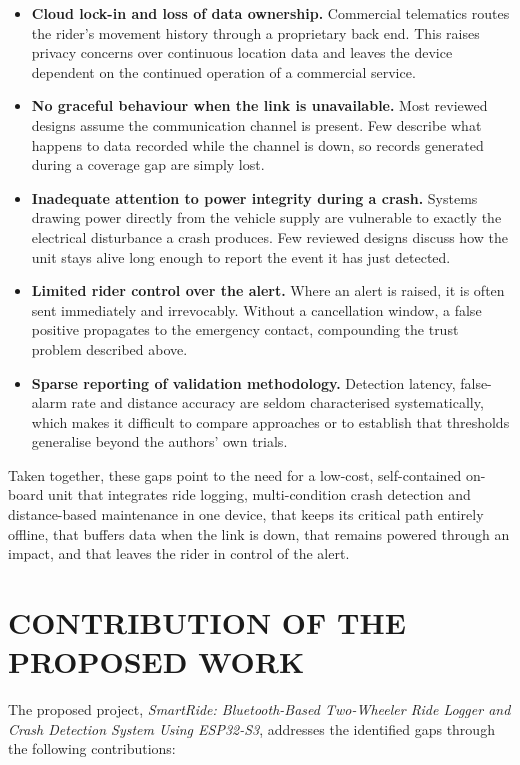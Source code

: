 \documentclass[12pt,a4paper,oneside]{report}
\begin{document}
\begin{itemize}[leftmargin=*,itemsep=0.6em,topsep=0.7em]
\item \textbf{Cloud lock-in and loss of data ownership.} Commercial telematics routes the
rider's movement history through a proprietary back end. This raises privacy concerns over
continuous location data and leaves the device dependent on the continued operation of a
commercial service.

\item \textbf{No graceful behaviour when the link is unavailable.} Most reviewed designs
assume the communication channel is present. Few describe what happens to data recorded
while the channel is down, so records generated during a coverage gap are simply lost.

\item \textbf{Inadequate attention to power integrity during a crash.} Systems drawing power
directly from the vehicle supply are vulnerable to exactly the electrical disturbance a
crash produces. Few reviewed designs discuss how the unit stays alive long enough to report
the event it has just detected.

\item \textbf{Limited rider control over the alert.} Where an alert is raised, it is often
sent immediately and irrevocably. Without a cancellation window, a false positive
propagates to the emergency contact, compounding the trust problem described above.

\item \textbf{Sparse reporting of validation methodology.} Detection latency, false-alarm
rate and distance accuracy are seldom characterised systematically, which makes it difficult
to compare approaches or to establish that thresholds generalise beyond the authors' own
trials.
\end{itemize}

Taken together, these gaps point to the need for a low-cost, self-contained on-board unit
that integrates ride logging, multi-condition crash detection and distance-based maintenance
in one device, that keeps its critical path entirely offline, that buffers data when the
link is down, that remains powered through an impact, and that leaves the rider in control
of the alert.

\section{CONTRIBUTION OF THE PROPOSED WORK}

The proposed project, \textit{SmartRide: Bluetooth-Based Two-Wheeler Ride Logger and Crash
Detection System Using ESP32-S3}, addresses the identified gaps through the following
contributions:
\end{document}
